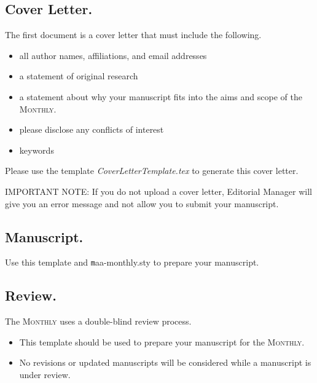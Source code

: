 \documentclass{article}
\theoremstyle{theorem}
\theoremstyle{definition}
\begin{document}
\subsection{Cover Letter.}
The first document is a cover letter that must include the following.
\begin{itemize}
\item all author names, affiliations, and email addresses
\item a statement of original research
\item a statement about why your manuscript fits into the aims and scope of the \textsc{Monthly}.
\item please disclose any conflicts of interest
\item keywords
\end{itemize}
Please use the template {\textit{CoverLetterTemplate.tex}} to generate this cover letter. 

IMPORTANT NOTE: If you do not upload a cover letter, Editorial Manager will give you an error message and not allow you to submit your manuscript.

\subsection{Manuscript.}  Use this template and {\texttt maa-monthly.sty} to prepare your manuscript.

\subsection{Review.}  The \textsc{Monthly} uses a double-blind review process.  
\begin{itemize}
\item This template should be used to prepare your manuscript for the \textsc{Monthly}.
\item No revisions or updated manuscripts will be considered while a manuscript is under review.
\end{itemize}
\end{document}
